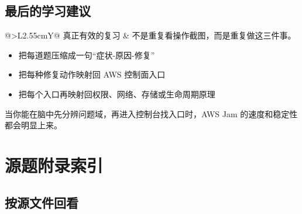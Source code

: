 \documentclass[12pt,a4paper]{article}
\makeatletter
\newcommand{\labelline}[2]{%
  \par\noindent
  \begin{tabularx}{\linewidth}{@{}>{\color{terracotta}\sffamily\bfseries}L{2.55cm}Y@{}}
    #1 & #2
  \end{tabularx}\par
}
\makeatother
\begin{document}
\subsection{最后的学习建议}

\begin{principlebox}
  \labelline{真正有效的复习}{不是重复看操作截图，而是重复做这三件事。}
  \begin{itemize}
    \item 把每道题压缩成一句“症状-原因-修复”
    \item 把每种修复动作映射回 AWS 控制面入口
    \item 把每个入口再映射回权限、网络、存储或生命周期原理
  \end{itemize}
  当你能在脑中先分辨问题域，再进入控制台找入口时，AWS Jam 的速度和稳定性都会明显上来。
\end{principlebox}

\clearpage
\appendix
\section{源题附录索引}

\subsection{按源文件回看}
\end{document}
